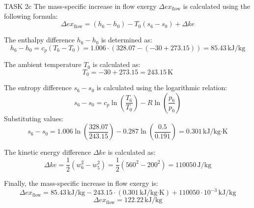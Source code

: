 TASK 2c  
The mass-specific increase in flow exergy \( \Delta ex_{\text{flow}} \) is calculated using the following formula:  
\[
\Delta ex_{\text{flow}} = (h_6 - h_0) - T_0 (s_6 - s_0) + \Delta ke
\]  

The enthalpy difference \( h_6 - h_0 \) is determined as:  
\[
h_6 - h_0 = c_p (T_6 - T_0) = 1.006 \cdot (328.07 - (-30 + 273.15)) = 85.43 \, \text{kJ/kg}
\]  

The ambient temperature \( T_0 \) is calculated as:  
\[
T_0 = -30 + 273.15 = 243.15 \, \text{K}
\]  

The entropy difference \( s_6 - s_0 \) is calculated using the logarithmic relation:  
\[
s_6 - s_0 = c_p \ln \left( \frac{T_6}{T_0} \right) - R \ln \left( \frac{p_6}{p_0} \right)
\]  
Substituting values:  
\[
s_6 - s_0 = 1.006 \ln \left( \frac{328.07}{243.15} \right) - 0.287 \ln \left( \frac{0.5}{0.191} \right) = 0.301 \, \text{kJ/kg·K}
\]  

The kinetic energy difference \( \Delta ke \) is calculated as:  
\[
\Delta ke = \frac{1}{2} (w_6^2 - w_5^2) = \frac{1}{2} (560^2 - 200^2) = 110050 \, \text{J/kg}
\]  

Finally, the mass-specific increase in flow exergy is:  
\[
\Delta ex_{\text{flow}} = 85.43 \, \text{kJ/kg} - 243.15 \cdot (0.301 \, \text{kJ/kg·K}) + 110050 \cdot 10^{-3} \, \text{kJ/kg}
\]  
\[
\Delta ex_{\text{flow}} = 122.22 \, \text{kJ/kg}
\]